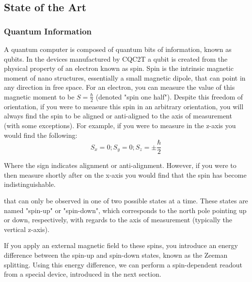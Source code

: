 \subsection{State of the Art}
\subsubsection{Quantum Information}
A quantum computer is composed of quantum bits of information, known as qubits. In the devices manufactured by CQC2T a qubit is created from the physical property of an electron known as spin. Spin is the intrinsic magnetic moment of nano structures, essentially a small magnetic dipole, that can point in any direction in free space. For an electron, you can measure the value of this magnetic moment to be $S = \frac{\hbar}{2}$ (denoted "spin one half"). Despite this freedom of orientation, if you were to measure this spin in an arbitrary orientation, you will always find the spin to be aligned or anti-aligned to the axis of measurement (with some exceptions). For example, if you were to measure in the z-axis you would find the following:
$$S_x = 0; S_y = 0; S_z = \pm\frac{\hbar}{2}$$

Where the sign indicates alignment or anti-alignment.
However, if you were to then measure shortly after on the x-axis you would find that the spin has become indistinguishable.

that can only be observed in one of two possible states at a time. These states are named "spin-up" or "spin-down", which corresponds to the north pole pointing up or down, respectively, with regards to the axis of measurement (typically the vertical z-axis). 

If you apply an external magnetic field to these spins, you introduce an energy difference between the spin-up and spin-down states, known as the Zeeman splitting. Using this energy difference, we can perform a spin-dependent readout from a special device, introduced in the next section.
